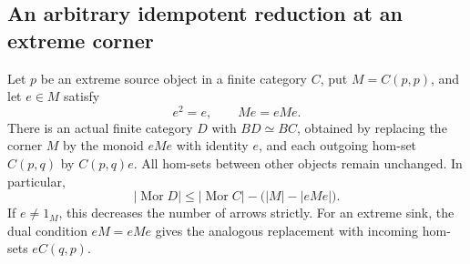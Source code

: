 \subsection{An arbitrary idempotent reduction at an extreme corner}

\begin{theorem}[Proved]
\label{CP2:A-extreme-idempotent-corner-reduction}
Let $p$ be an extreme source object in a finite category $C$, put
$M=C(p,p)$, and let $e\in M$ satisfy
\[
 e^2=e,\qquad Me=eMe.
\]
There is an actual finite category $D$ with $BD\simeq BC$, obtained
by replacing the corner $M$ by the monoid $eMe$ with identity $e$,
and each outgoing hom-set $C(p,q)$ by $C(p,q)e$.
All hom-sets between other objects remain unchanged.  In particular,
\[
 |\operatorname{Mor}D|\leq
 |\operatorname{Mor}C|-\bigl(|M|-|eMe|\bigr).
\]
If $e\ne1_M$, this decreases the number of arrows strictly.
For an extreme sink, the dual condition $eM=eMe$ gives the analogous
replacement with incoming hom-sets $eC(q,p)$.
\end{theorem}
